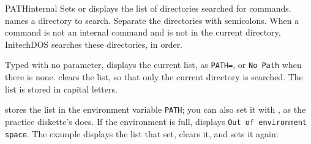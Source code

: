 \begin{DosEntry}{PATH}{}{internal}
\Purpose Sets or displays the list of directories searched for commands.
\Format {}
\Remarks
{} names a directory to search.  Separate the directories with
semicolons.  When a command is not an internal command and is not in the
current directory, InitechDOS searches these directories, in order.

Typed with no parameter,  displays the current list, as
\texttt{PATH=}, or \texttt{No Path} when there is none.
 clears the list, so that only the current directory is
searched.  The list is stored in capital letters.

 stores the list in the environment variable \texttt{PATH}; you
can also set it with , as the practice
diskette's  does.  If the environment is full,
 displays \texttt{Out of environment space}.
\Example
The example displays the list that  set, clears it, and
sets it again:
\end{DosEntry}

